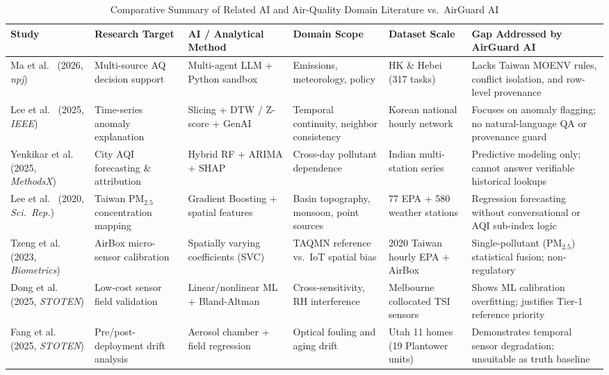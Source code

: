 \documentclass[conference]{IEEEtran}
\begin{document}
\begin{table}[!t]
\centering
\caption{Comparative Summary of Related AI and Air-Quality Domain Literature vs.\ AirGuard AI}
\label{tab:related_work}
\footnotesize
\setlength{\tabcolsep}{4pt}
\renewcommand{\arraystretch}{1.15}
\begin{tabularx}{\textwidth}{@{}L{2.0cm} L{2.4cm} L{2.6cm} L{2.5cm} L{2.4cm} Y@{}}
\toprule
\textbf{Study} & \textbf{Research Target} & \textbf{AI / Analytical Method} & \textbf{Domain Scope} & \textbf{Dataset Scale} & \textbf{Gap Addressed by AirGuard AI} \\
\midrule
Ma et al.~\cite{ma2026neuroair} (2026, \emph{npj}) & Multi-source AQ decision support & Multi-agent LLM + Python sandbox & Emissions, meteorology, policy & HK \& Hebei (317 tasks) & Lacks Taiwan MOENV rules, conflict isolation, and row-level provenance \\
Lee et al.~\cite{lee2025anomaly} (2025, \emph{IEEE}) & Time-series anomaly explanation & Slicing + DTW / Z-score + GenAI & Temporal continuity, neighbor consistency & Korean national hourly network & Focuses on anomaly flagging; no natural-language QA or provenance guard \\
Yenkikar et al.~\cite{yenkikar2025explainable} (2025, \emph{MethodsX}) & City AQI forecasting \& attribution & Hybrid RF + ARIMA + SHAP & Cross-day pollutant dependence & Indian multi-station series & Predictive modeling only; cannot answer verifiable historical lookups \\
Lee et al.~\cite{lee2020forecasting} (2020, \emph{Sci.\ Rep.}) & Taiwan $\text{PM}_{2.5}$ concentration mapping & Gradient Boosting + spatial features & Basin topography, monsoon, point sources & 77 EPA + 580 weather stations & Regression forecasting without conversational or AQI sub-index logic \\
Tzeng et al.~\cite{tzeng2023airbox} (2023, \emph{Biometrics}) & AirBox micro-sensor calibration & Spatially varying coefficients (SVC) & TAQMN reference vs.\ IoT spatial bias & 2020 Taiwan hourly EPA + AirBox & Single-pollutant ($\text{PM}_{2.5}$) statistical fusion; non-regulatory \\
Dong et al.~\cite{dong2025calibration} (2025, \emph{STOTEN}) & Low-cost sensor field validation & Linear/nonlinear ML + Bland-Altman & Cross-sensitivity, RH interference & Melbourne collocated TSI sensors & Shows ML calibration overfitting; justifies Tier-1 reference priority \\
Fang et al.~\cite{fang2025deployment} (2025, \emph{STOTEN}) & Pre/post-deployment drift analysis & Aerosol chamber + field regression & Optical fouling and aging drift & Utah 11 homes (19 Plantower units) & Demonstrates temporal sensor degradation; unsuitable as truth baseline \\

\end{tabularx}
\end{table}
\end{document}

